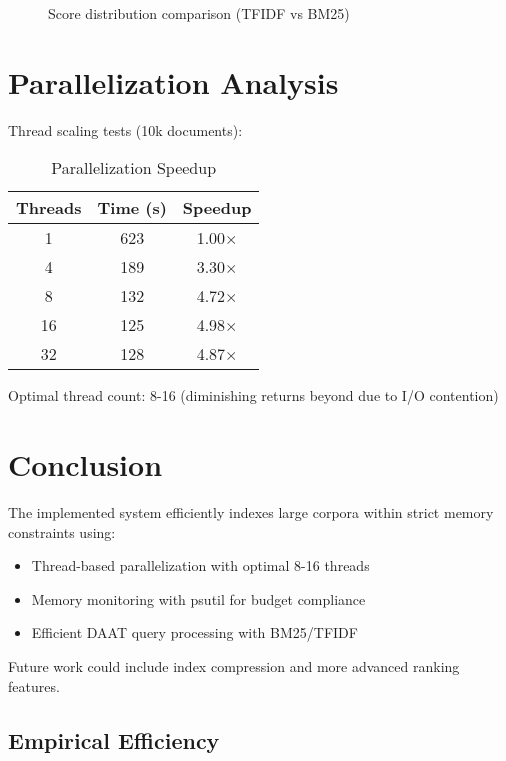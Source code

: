 \begin{figure}[htbp]
  \centering
  \caption{Score distribution comparison (TFIDF vs BM25)}
  \label{fig:scores}
\end{figure}

\section{Parallelization Analysis}
Thread scaling tests (10k documents):

\begin{table}[htbp]
  \caption{Parallelization Speedup}
  \label{tab:speedup}
  \begin{tabular}{ccc}
    \toprule
    \textbf{Threads} & \textbf{Time (s)} & \textbf{Speedup} \\
    \midrule
    1                & 623               & 1.00$\times$     \\
    4                & 189               & 3.30$\times$     \\
    8                & 132               & 4.72$\times$     \\
    16               & 125               & 4.98$\times$     \\
    32               & 128               & 4.87$\times$     \\
    \bottomrule
  \end{tabular}
\end{table}

Optimal thread count: 8-16 (diminishing returns beyond due to I/O contention)

\section{Conclusion}
The implemented system efficiently indexes large corpora within strict memory constraints using:
\begin{itemize}
  \item Thread-based parallelization with optimal 8-16 threads
  \item Memory monitoring with psutil for budget compliance
  \item Efficient DAAT query processing with BM25/TFIDF
\end{itemize}

Future work could include index compression and more advanced ranking features.

\subsection{Empirical Efficiency}

